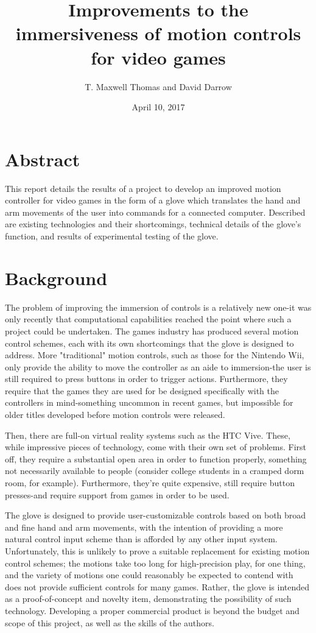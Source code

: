 \documentclass{article}
\begin{document}
	\begin{titlepage}
		\title{Improvements to the immersiveness  of motion controls for video games}
		\date{April 10, 2017}
		\author{T. Maxwell Thomas and David Darrow}
		\maketitle
	\end{titlepage}
	\section{Abstract}
	
	This report details the results of a project to develop an improved motion controller for video games in the form of a glove which translates the hand and arm movements of the user into commands for a connected computer. Described are existing technologies and their shortcomings, technical details of the glove's function, and results of experimental testing of the glove.
	\section{Background}
	
	The problem of improving the immersion of controls is a relatively new one-it was only recently that computational capabilities reached the point where such a project could be undertaken. The games industry has produced several motion control schemes, each with its own shortcomings that the glove is designed to address. More "traditional" motion controls, such as those for the Nintendo Wii, only provide the ability to move the controller as an aide to immersion-the user is still required to press buttons in order to trigger actions. Furthermore, they require that the games they are used for be designed specifically with the controllers in mind-something uncommon in recent games, but impossible for older titles developed before motion controls were released.
	
	Then, there are full-on virtual reality systems such as the HTC Vive. These, while impressive pieces of technology, come with their own set of problems. First off, they require a substantial open area in order to function properly, something not necessarily available to people (consider college students in a cramped dorm room, for example). Furthermore, they're quite expensive, still require button presses-and require support from games in order to be used.
	
	The glove is designed to provide user-customizable controls based on both broad and fine hand and arm movements, with the intention of providing a more natural control input scheme than is afforded by any other input system. Unfortunately, this is unlikely to prove a suitable replacement for existing motion control schemes; the motions take too long for high-precision play, for one thing, and the variety of motions one could reasonably be expected to contend with does not provide sufficient controls for many games. Rather, the glove is intended as a proof-of-concept and novelty item, demonstrating the possibility of such technology. Developing a proper commercial product is beyond the budget and scope of this project, as well as the skills of the authors.
\end{document}
